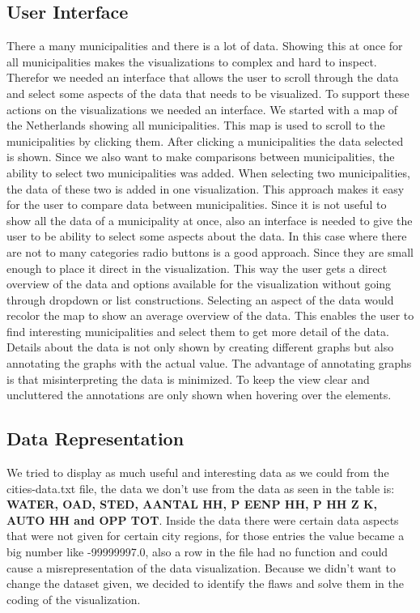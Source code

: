 \documentclass[a4paper,twoside,11pt]{article}
\begin{document}
\subsection{User Interface}
There a many municipalities and there is a lot of data. Showing this at once for all municipalities makes the visualizations to complex and hard to inspect. Therefor we needed an interface that allows the user to scroll through the data and select some aspects of the data that needs to be visualized. To support these actions on the visualizations we needed an interface. \newline
We started with a map of the Netherlands showing all municipalities. This map is used to scroll to the municipalities by clicking them. After clicking a municipalities the data selected is shown.  Since we also want to make comparisons between municipalities, the ability to select two municipalities was added. When selecting two municipalities, the data of these two is added in one visualization. This approach makes it easy for the user to compare data between municipalities. \newline
Since it is not useful to show all the data of a municipality at once, also an interface is needed to give the user to be ability to select some aspects about the data. In this case where there are not to many categories radio buttons is a good approach. Since they are small enough to place it direct in the visualization. This way the user gets a direct overview of the data and options available for the visualization without going through dropdown or list constructions. Selecting an aspect of the data would recolor the map to show an average overview of the data. This enables the user to find interesting municipalities and select them to get more detail of the data. \newline
Details about the data is not only shown by creating different graphs but also annotating the graphs with the actual value. The advantage of annotating graphs is that misinterpreting the data is minimized. To keep the view clear and uncluttered the annotations are only shown when hovering over the elements.

\subsection{Data Representation}
We tried to display as much useful and interesting data as we could from the cities-data.txt file, the data we don't use from the data as seen in the table is: \textbf{WATER, OAD, STED, AANTAL HH, P EENP HH, P HH Z K, AUTO HH and OPP TOT}. \newline
Inside the data there were certain data aspects that were not given for certain city regions, for those entries the value became a big number like -99999997.0, also a row in the file had no function and could cause a misrepresentation of the data visualization. Because we didn't want to change the dataset given, we decided to identify the flaws and solve them in the coding of the visualization. \newline
\newpage
\end{document}
